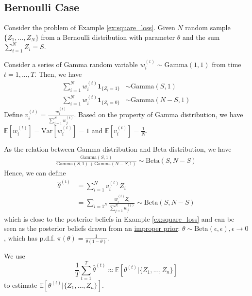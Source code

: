 \documentclass[11pt]{elegantbook}
\begin{document}
\subsection{Bernoulli Case}
Consider the problem of Example \ref{ex:square_loss}. Given $N$ random sample $\{Z_1,...,Z_N\}$ from a Bernoulli distribution with parameter $\theta$ and the sum $\sum_{i=1}^N Z_i=S$.

Consider a series of Gamma random variable $w_i^{(t)}\sim \text{Gamma}(1,1)$ from time $t=1,...,T$. Then, we have
\begin{equation}
    \begin{aligned}
        \sum_{i=1}^N w_i^{(t)} \mathbf{1}_{\{Z_i=1\}}&\sim \text{Gamma}(S,1)\\
        \sum_{i=1}^N w_i^{(t)} \mathbf{1}_{\{Z_i=0\}}&\sim \text{Gamma}(N-S,1)
    \end{aligned}
    \nonumber
\end{equation}
Define $v_i^{(t)}=\frac{w_i^{(t)}}{\sum_{j=1}^N w_j^{(t)}}$. Based on the property of Gamma distribution, we have $\mathbb{E}[w_i^{(t)}]=\text{Var}[w_i^{(t)}]=1$ and $\mathbb{E}[v_i^{(t)}]=\frac{1}{N}$.

As the relation between Gamma distribution and Beta distribution, we have
\begin{equation}
    \begin{aligned}
        \frac{\text{Gamma}(S,1)}{\text{Gamma}(S,1)+\text{Gamma}(N-S,1)}\sim \text{Beta}(S,N-S)
    \end{aligned}
    \nonumber
\end{equation}
Hence, we can define
\begin{equation}
    \begin{aligned}
        \hat{\theta}^{(t)}&=\sum_{i=1}^N v_i^{(t)}Z_i\\
        &=\sum_{i=1^N}\frac{w_i^{(t)}Z_i}{\sum_{j=1}^N w_j^{(t)}}\sim \text{Beta}(S,N-S)
    \end{aligned}
    \nonumber
\end{equation}
which is close to the posterior beliefs in Example \ref{ex:square_loss} and can be seen as the posterior beliefs drawn from an \underline{improper prior}: $\theta\sim \text{Beta}(\epsilon,\epsilon), \epsilon \rightarrow 0$, which has p.d.f. $\pi(\theta)=\frac{1}{\theta(1-\theta)}$.

We use $$\frac{1}{T}\sum_{t=1}^T\hat{\theta}^{(t)}\approx \mathbb{E}[\theta^{(t)}|\{Z_1,...,Z_n\}]$$ to estimate $\mathbb{E}[\theta^{(t)}|\{Z_1,...,Z_n\}]$.
\end{document}
